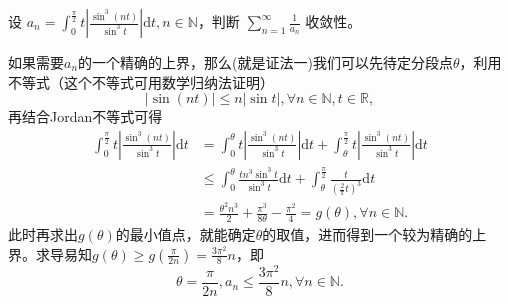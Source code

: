 \documentclass[../../main.tex]{subfiles}
\begin{document}
\begin{example}
设 \( a_n = \int_{0}^{\frac{\pi}{2}} t \left| \frac{\sin^3 (nt)}{\sin^3 t} \right| \mathrm{d}t, n \in \mathbb{N} \)，判断 \( \sum_{n = 1}^{\infty} \frac{1}{a_n} \) 收敛性。
\end{example}
\begin{note}
如果需要$a_n$的一个精确的上界，那么(就是证法一)我们可以先待定分段点$\theta$，利用不等式（这个不等式可用数学归纳法证明）
\[
|\sin(nt)| \leqslant n|\sin t|, \forall n \in \mathbb{N}, t \in \mathbb{R},
\]
再结合Jordan不等式可得
\begin{align*}
\int_0^{\frac{\pi}{2}} t \left| \frac{\sin^3(nt)}{\sin^3 t} \right| \mathrm{d}t &= \int_0^{\theta} t \left| \frac{\sin^3(nt)}{\sin^3 t} \right| \mathrm{d}t + \int_{\theta}^{\frac{\pi}{2}} t \left| \frac{\sin^3(nt)}{\sin^3 t} \right| \mathrm{d}t \\
&\leqslant \int_0^{\theta} \frac{t n^3 \sin^3 t}{\sin^3 t} \mathrm{d}t + \int_{\theta}^{\frac{\pi}{2}} \frac{t}{\left( \frac{2}{\pi} t \right)^3} \mathrm{d}t \\
&= \frac{\theta^2 n^3}{2} + \frac{\pi^3}{8 \theta} - \frac{\pi^2}{4} = g(\theta), \forall n \in \mathbb{N}.
\end{align*}
此时再求出$g(\theta)$的最小值点，就能确定$\theta$的取值，进而得到一个较为精确的上界。求导易知$g(\theta) \geqslant g\left( \frac{\pi}{2n} \right) = \frac{3\pi^2}{8} n$，即
\[
\theta = \frac{\pi}{2n}, a_n \leqslant \frac{3\pi^2}{8} n, \forall n \in \mathbb{N}.
\]
\end{note}
\end{document}
